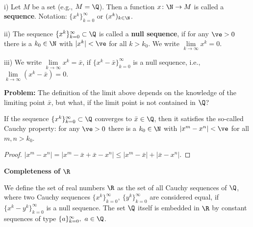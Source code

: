 {\begin{frame}
\begin{defi}~\\[-2pt]
	\ite
	\item[i)] Let $M$ be a set (e.g., $M = \Q$). Then a function $x\colon \N \to M$ is called a \textbf{sequence}. Notation: $\{x^k\}_{k=0}^\infty$ or $(x^k)_{k\in \N}$.
	\item[ii)] The sequence  $\{x^k\}_{k=0}^\infty\subset\Q$ is called a \textbf{null sequence}, if for any $\ve >0$ there is a $k_0\in\N$ with
	$|x^k|<\ve$ for all $k>k_0$. We write $\lim\limits_{k\to\infty}x^k=0$.
	\item[iii)] We write $\lim\limits_{k\to\infty}x^k=\bar{x}$, if 
	$\{x^k-\bar{x}\}_{k=0}^\infty$ is a null sequence, i.e., 
	$\lim\limits_{k\to\infty}(x^k-\bar{x})=0$.
	\eti
\end{defi}

\textbf{Problem:} The definition of the limit above depends on the knowledge of the limiting point $\bar{x}$, but what, if the limit point is not contained in $\Q$?

\begin{theo}
	If the sequence  $\{x^k\}_{k=0}^\infty\subset\Q$ converges to $\bar{x}\in\Q$, then it satisfies the so-called {\sc Cauchy} property:
	for any $\ve >0$ there is a $k_0\in\N$ with
	$|x^m-x^n|<\ve$ for all $m,n>k_0$.
\end{theo}
\begin{proof}$|x^m-x^n|=|x^m-\bar{x}+\bar{x}-x^n|\le |x^m-\bar{x}|+|\bar{x}-x^n|$.
\end{proof}
\end{frame}


\begin{frame} 
\textbf{Completeness of $\R$}
\begin{defi} \label{R-complete} We define the set of real numbers $\R$ as the set of all Cauchy sequences of $\Q$, where two Cauchy sequences $\{x^k\}_{k=0}^\infty,~\{y^k\}_{k=0}^\infty$ are considered equal, if $\{x^k-y^k\}_{k=0}^\infty$ is a null sequence. The set $\Q$ itself is embedded in $\R$ by constant sequences of type $\{a\}_{k=0}^\infty,~ a\in\Q$.
\end{defi}


\end{frame}}
